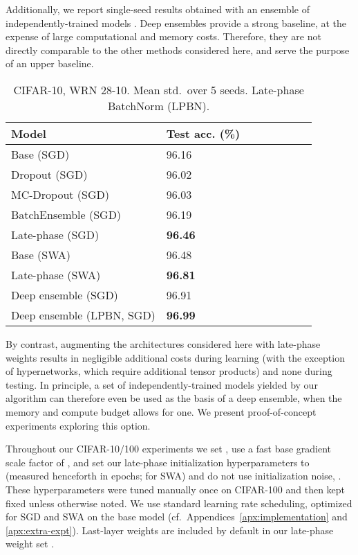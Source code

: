 \documentclass{article} \usepackage{iclr2021_conference,times}
\begin{document}
Additionally, we report single-seed results obtained with an ensemble of  independently-trained models \citep[a deep ensemble,][]{lakshminarayanan_simple_2017}. Deep ensembles provide a strong baseline, at the expense of large computational and memory costs. Therefore, they are not directly comparable to the other methods considered here, and serve the purpose of an upper baseline.

\setlength\intextsep{0pt}
\begin{wraptable}[16]{r}{0.5\textwidth}
\caption{CIFAR-10, WRN 28-10. Mean  std.~over 5 seeds. Late-phase BatchNorm (LPBN).}
  \label{tab:CIFAR-10}
\centering
  {\renewcommand{\arraystretch}{1.1}\setlength{\tabcolsep}{4pt}
  \begin{tabular}{@{}llllllll@{}} 
    \toprule
Model & Test acc. (\%) \\\midrule
Base (SGD)      &    96.16  \\
Dropout (SGD)   & 96.02 \\
MC-Dropout (SGD)   & 96.03 \\
BatchEnsemble (SGD)   & 96.19 \\
Late-phase (SGD)  & \textbf{96.46}    \\\midrule
Base (SWA)      &    96.48   \\
Late-phase (SWA) & \textbf{96.81}    \\
\midrule
Deep ensemble (SGD) &  96.91  \\
Deep ensemble (LPBN, SGD) &  \textbf{96.99}  \\\bottomrule
    \end{tabular}}
\end{wraptable}
By contrast, augmenting the architectures considered here with late-phase weights results in negligible additional costs during learning (with the exception of hypernetworks, which require additional tensor products) and none during testing. In principle, a set of independently-trained models yielded by our algorithm can therefore even be used as the basis of a deep ensemble, when the memory and compute budget allows for one. We present proof-of-concept experiments exploring this option.


Throughout our CIFAR-10/100 experiments we set , use a fast base gradient scale factor of , and set our late-phase initialization hyperparameters to  (measured henceforth in epochs;  for SWA) and do not use initialization noise, . These hyperparameters were tuned manually once on CIFAR-100 and then kept fixed unless otherwise noted. We use standard learning rate scheduling, optimized for SGD and SWA on the base model (cf.~Appendices~\ref{apx:implementation} and \ref{apx:extra-expt}). Last-layer weights are included by default in our late-phase weight set .
\end{document}
